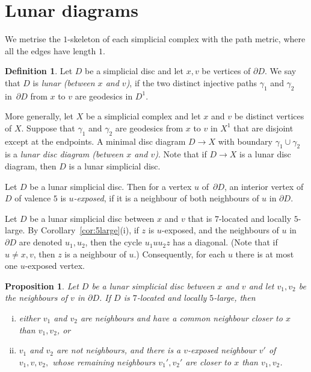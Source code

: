 \documentclass[a4paper,12pt,leqno]{amsart}
\newtheorem{prop}[thm]{Proposition}
\theoremstyle{definition}
\newtheorem{defn}[thm]{Definition}
\begin{document}
\section{Lunar diagrams}

We metrise the $1$-skeleton of each simplicial complex with the path metric, where all the edges have length $1$.

\begin{defn}
    Let $D$ be a simplicial disc and let $x,v$ be vertices of $\partial D$.
    We say that $D$ is \emph{lunar (between $x$ and $v$)}, if the two distinct injective paths $\gamma_1$ and $\gamma_2$ in~$\partial D$ from $x$ to $v$ are geodesics in $D^1$.
    
    More generally, let $X$ be a simplicial complex and let $x$ and $v$ be distinct vertices of $X$. Suppose that $\gamma_1$ and $\gamma_2$ are geodesics from $x$ to $v$ in $X^1$ 
    that are disjoint except at the endpoints.
    A minimal disc diagram $D\to X$ with boundary $\gamma_1 \cup \gamma_2$ is a \emph{lunar disc diagram (between $x$ and $v$)}. Note that if $D\to X$ is a lunar disc diagram, then $D$ is a lunar simplicial disc.


Let $D$ be a lunar simplicial disc. Then for a vertex $u$ of~$\partial D$, an interior vertex of~$D$ of valence $5$ is \emph{$u$-exposed},  
if it is a neighbour of both neighbours of $u$ 
in $\partial D$. 
\end{defn}

Let $D$ be a lunar simplicial disc between $x$ and $v$ that is $7$-located and locally $5$-large. By Corollary~\ref{cor:5large}(i), if $z$ is $u$-exposed, and the neighbours of $u$ in $\partial D$ are denoted $u_1,u_2$, then the cycle $u_1uu_2z$ has a diagonal. (Note that if $u\neq x,v$, then $z$ is a neighbour of $u$.) Consequently, for each $u$ there is at most one $u$-exposed vertex.  


\begin{prop} \label{prop:lunar2}
Let $D$ be a lunar simplicial disc between $x$ and $v$ and let $v_1,v_2$ be the neighbours of $v$ in $\partial D$. If $D$ is $7$-located and locally $5$-large, then 
\begin{enumerate}[(i)]
\item either $v_1$ and $v_2$ are neighbours and have a common neighbour closer to $x$ than $v_1,v_2$, or
\item $v_1$ and $v_2$ are not neighbours, and there is a $v$-exposed neighbour $v'$ of $v_1,v,v_2,$ whose remaining neighbours $v_1',v_2'$ are closer to $x$ than $v_1,v_2$.
\end{enumerate}
\end{prop}
\end{document}
